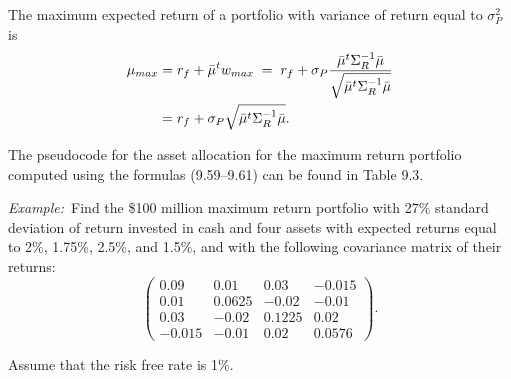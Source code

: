 
The maximum expected return of a portfolio with variance of return equal to
$\sigma_P^2$ is
\begin{align}
\mu_{max} &= r_f+\bar\mu^tw_{max} \;=\;
r_f+\sigma_P\frac{\bar\mu^t\Sigma_R^{-1}\bar\mu}{\sqrt{\bar\mu^t\Sigma_R^{-1}\bar\mu}}
\notag\\
&= r_f+\sigma_P\sqrt{\bar\mu^t\Sigma_R^{-1}\bar\mu}.
\end{align}

The pseudocode for the asset allocation for the maximum return portfolio computed
using the formulas (9.59--9.61) can be found in Table 9.3.

\par\medskip\noindent\textit{Example:}\ Find the \$100 million maximum return
portfolio with 27\% standard deviation of return invested in cash and four assets
with expected returns equal to 2\%, 1.75\%, 2.5\%, and 1.5\%, and with the following
covariance matrix of their returns:
\[
\begin{pmatrix}
0.09 & 0.01 & 0.03 & -0.015 \\
0.01 & 0.0625 & -0.02 & -0.01 \\
0.03 & -0.02 & 0.1225 & 0.02 \\
-0.015 & -0.01 & 0.02 & 0.0576
\end{pmatrix}.
\]

Assume that the risk free rate is 1\%.

